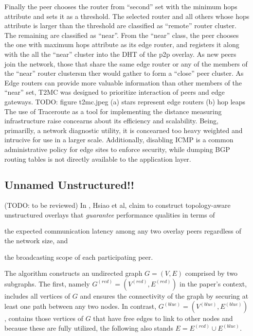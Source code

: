 \documentclass[a4paper,10pt]{article}
\begin{document}
Finally the peer chooses the router from ``second'' set with the minimum hops attribute and sets it as a threshold. The selected router and all others whose hops attribute is larger than the threshold are classified as ``remote'' router cluster. The remaining are classified as ``near''. From the ``near'' class, the peer chooses the one with maximum hops attribute as its edge router, and registers it along with the all the ``near'' cluster into the DHT of the p2p overlay. As new peers join the network, those that share the same edge router or any of the members of the ``near'' router clustersm ther would gather to form a ``close'' peer cluster. As Edge routers can provide more valuable information than other members of the ``near'' set, T2MC was designed to prioritize interaction of peers and edge gateways.
TODO: figure t2mc.jpeg (a) stars represent edge routers (b) hop leaps
The use of Traceroute as a tool for implementing the distance measuring infrastructure raise concearns about its efficiency and scalability. Being, primarilly, a network diagnostic utility, it is concearned too heavy weighted and intrucive for use in a larger scale\cite{ratnasamy_binning_2002}. Additionally, disabling ICMP is a common administrative policy for edge sites to enforce security, while dumping BGP routing tables\cite{krishnamurthy_bgpclust_2000} is not directly available to the application layer.

\subsection{Unnamed Unstructured!!}
(TODO: to be reviewed)
In \cite{hsiao_redblue_2009}, Hsiao et al, claim to construct topology-aware unstructured overlays that \emph{guarantee} performance qualities in terms of
\begin{inparaenum}
  \item the expected communication latency among any two overlay peers regardless of the network size, and
  \item the broadcasting scope of each participating peer.
\end{inparaenum}

The algorithm constructs an undirected graph $G = \left( V, E \right)$ comprised by two subgraphs. The first, namely $G^{\left( red \right)} = \left( V^{\left( red \right)}, E^{\left( red \right)} \right)$ in the paper's context, includes all vertices of $G$ and ensures the connectivity of the graph by securing at least one path between any two nodes. In contrast, $G^{\left( blue \right)} = \left( V^{\left( blue \right)}, E^{\left( blue \right)} \right)$, contains those vertices of $G$ that have free edges to link to other nodes and because these are fully utilized, the following also stands $E = E^{\left( red \right)} \cup E^{\left( blue \right)}$.
\end{document}
